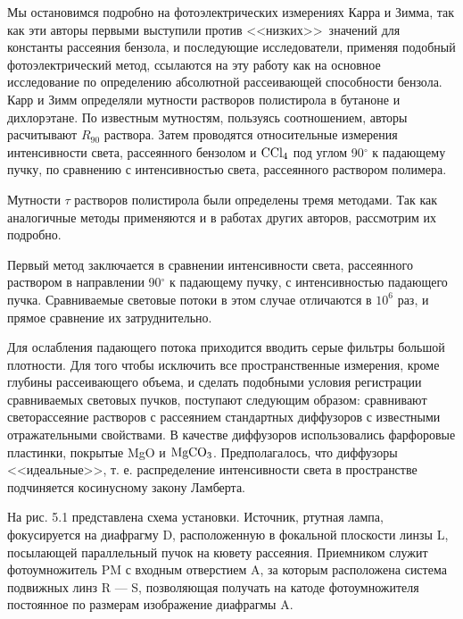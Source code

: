 Мы остановимся подробно на фотоэлектрических измерениях Карра и
Зимма, так как эти авторы первыми выступили против <<низких>>\ значений для константы рассеяния бензола, и
последующие  исследователи, применяя подобный фотоэлектрический
метод, ссылаются на эту работу как на основное исследование по
определению абсолютной рассеивающей способности бензола. Карр и
Зимм определяли мутности растворов полистирола в бутаноне и
дихлорэтане. По известным мутностям, пользуясь соотношением,
авторы расчитывают $R_{90}$ раствора. Затем проводятся
относительные измерения интенсивности света, рассеянного бензолом
и ${\rm CCl_4}$ под углом 90$^{\circ}$ к падающему пучку, по
сравнению с интенсивностью света, рассеянного раствором полимера.

Мутности $\tau$ растворов полистирола были определены тремя
методами. Так как аналогичные методы применяются и в работах
других авторов, рассмотрим их подробно.

Первый метод заключается в сравнении интенсивности света,
рассеянного раствором в направлении 90$^{\circ}$ к падающему
пучку, с интенсивностью падающего пучка. Сравниваемые световые
потоки в этом случае отличаются в $10^{6}$ раз, и прямое
сравнение их затруднительно.

Для ослабления падающего потока приходится вводить серые фильтры
большой плотности. Для того чтобы исключить все пространственные
измерения, кроме глубины рассеивающего объема, и сделать подобными
условия регистрации сравниваемых световых пучков, поступают
следующим образом: сравнивают светорассеяние растворов с
рассеянием стандартных диффузоров с известными отражательными
свойствами. В качестве диффузоров использовались фарфоровые
пластинки, покрытые MgO и $\rm MgCO_3$. Предполагалось, что
диффузоры <<идеальные>>, т. е. распределение интенсивности
света в пространстве подчиняется косинусному закону Ламберта.

На рис. 5.1 представлена схема установки. Источник, ртутная
лампа, фокусируется на диафрагму D, расположенную в фокальной
плоскости линзы L, посылающей параллельный пучок на кювету
рассеяния. Приемником служит фотоумножитель PM с входным
отверстием A, за которым расположена система подвижных линз R ---
S, позволяющая получать на катоде фотоумножителя постоянное по
размерам изображение диафрагмы A.

